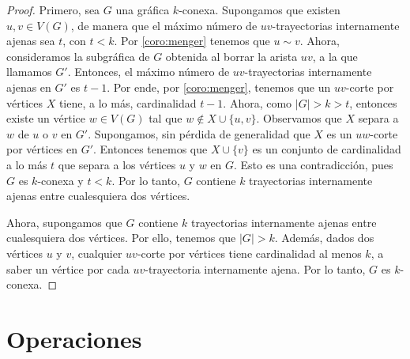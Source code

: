  \begin{proof}
     Primero, sea $G$ una gr\'afica $k$-conexa. Supongamos que existen $u,v \in
     V(G)$, de manera que el m\'aximo n\'umero de $uv$-trayectorias internamente
     ajenas sea $t$, con $t<k$. Por \cref{coro:menger} tenemos
     que $u \sim v$. Ahora, consideramos la subgr\'afica de $G$ obtenida al
     borrar la arista $uv$, a la que llamamos $G'$. Entonces, el m\'aximo
     n\'umero de $uv$-trayectorias internamente ajenas en $G'$ es $t-1$. Por
     ende, por  \cref{coro:menger}, tenemos que un $uv$-corte por
     v\'ertices $X$ tiene, a lo m\'as, cardinalidad $t-1$. Ahora, como $|G| > k
     > t$, entonces existe un v\'ertice $w \in V(G)$ tal que $w \notin
     X\cup\{u,v\}$. Observamos que $X$ separa a $w$ de $u$ o $v$ en $G'$.
     Supongamos, sin p\'erdida de generalidad que $X$ es un $uw$-corte por
     v\'ertices en $G'$. Entonces tenemos que $X\cup\{v\}$ es un conjunto de
     cardinalidad a lo m\'as $t$ que separa a los v\'ertices $u$ y $w$ en $G$.
     Esto es una contradicci\'on, pues $G$ es $k$-conexa y $t < k$. Por lo
     tanto, $G$ contiene $k$ trayectorias internamente ajenas entre cualesquiera
     dos v\'ertices.
 
     Ahora, supongamos que $G$ contiene $k$ trayectorias internamente ajenas
     entre cualesquiera dos v\'ertices. Por ello, tenemos que $|G|>k$. Adem\'as,
     dados dos v\'ertices $u$ y $v$, cualquier $uv$-corte por v\'ertices tiene
     cardinalidad al menos $k$, a saber un v\'ertice por cada $uv$-trayectoria
     internamente ajena. Por lo tanto, $G$ es $k$-conexa.
         
 \end{proof}
 
\section{Operaciones}
\label{sec:operaciones}

